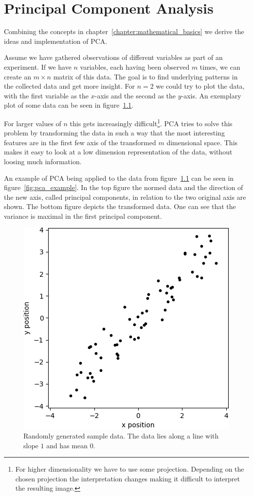 \chapter{Principal Component Analysis}
\label{chapter:principal_component_analysis}

Combining the concepts in chapter~\ref{chapter:mathematical_basics} we derive the ideas and implementation of PCA.

Assume we have gathered observations of different variables as part of an experiment. If we have $n$ variables, each having been observed $m$ times, we can create an $m \times n$ matrix of this data. \color{change} The goal is to find underlying patterns in the collected data and get more insight. \color{black} For $n = 2$ we could try to plot the data, with the first variable as the $x$-axis and the second as the $y$-axis. An exemplary plot of some data can be seen in figure~\ref{fig:some_nice_data}.

For larger values of $n$ this gets increasingly difficult\footnote{For higher dimensionality we have to use some projection. Depending on the chosen projection the interpretation changes making it difficult to interpret the resulting image.}. PCA tries to solve this problem by transforming the data in such a way that the most interesting features are in the first few axis of the transformed $m$ dimensional space. This makes it easy to look at a low dimension representation of the data, without loosing much information.

An example of PCA being applied to the data from figure~\ref{fig:some_nice_data} can be seen in figure~\ref{fig:pca_example}. In the top figure the normed data and the direction of the new axis, called principal components, in relation to the two original axis are shown. The bottom figure depicts the transformed data. One can see that the variance is maximal in the first principal component.

\begin{figure}[h!]
	\centering
	\includegraphics[width=0.45\linewidth]{figs/some_nice_data_org}
	\caption{Randomly generated sample data. The data lies along a line with slope $1$ and has mean $0$.}
	\label{fig:some_nice_data}
\end{figure}

